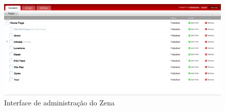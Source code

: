 \begin{figure}[here]
\includegraphics[width=150mm]{images/radiant_admin.png}
\caption{Interface de administração do Zena}
\label{fig:zena_admin.png}
\end{figure}

